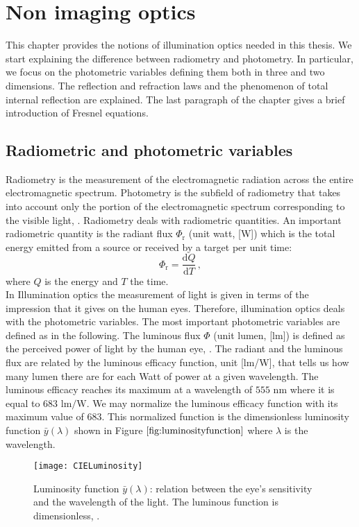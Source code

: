\chapter{Non imaging optics}
This chapter provides the notions of illumination optics needed in this thesis. We start explaining the difference between radiometry and photometry.
In particular, we focus on the photometric variables defining them both in three and two dimensions. The reflection and refraction laws and the phenomenon of total internal reflection are explained. The last paragraph of the chapter gives a brief introduction of Fresnel equations. 
\section{Radiometric and photometric variables}
Radiometry is the measurement of the electromagnetic radiation across the entire electromagnetic spectrum. Photometry is the subfield of radiometry that takes into account only the portion of the electromagnetic spectrum corresponding to the visible light, \cite{zalewski1995radiometry}. Radiometry deals with radiometric quantities. An important radiometric quantity  is the radiant flux $\Phi_{\textrm{r}}$ (unit watt, [\textrm{W}]) which is the total energy emitted from a source or received by a target per unit time:
\begin{equation}
\Phi_{\textrm{r}} = \frac{\textrm{d}Q}{\textrm{d}T}\,,
\end{equation}
where $Q$ is the energy and $T$ the time.\\
\indent In Illumination optics the measurement of light is given in terms of the impression that it gives on the human eyes. Therefore, illumination optics deals with the photometric variables. The most important photometric variables are defined as in the following. The luminous flux $\Phi$ (unit lumen, [\textrm{lm}]) is defined as the perceived power of light by the human eye, \cite{chaves2015introduction}.
 The radiant and the luminous flux are related by the luminous efficacy function, unit [lm/W], that tells us how many lumen there are for each Watt of power at a given wavelength.
 The luminous efficacy reaches its maximum  at a wavelength of $555$ $\textrm{nm}$ where it is equal to $683$ $\textrm{lm}/\textrm{W}$.
  We may normalize the luminous efficacy function with its maximum value of $683$.
  This normalized function is the dimensionless luminosity function $\bar{y}(\lambda)$ shown in Figure $\ref{fig:luminosityfunction}$ where $\lambda$ is the wavelength.
\begin{figure}[h]
  \begin{center}
  \texttt{[image: CIELuminosity]}
  \end{center}
  \caption{Luminosity function $\bar{y}(\lambda)$: relation between the eye's sensitivity and the wavelength of the light. The luminous function is dimensionless, \cite{wiki}.}
  \label{fig:luminosityfunction}
  \end{figure}
